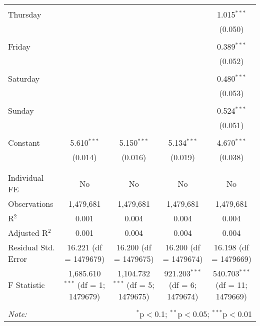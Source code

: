\documentclass[
]{article}
\begin{document}
\begin{table}[!htbp]
{\begin{tabular}{@{\extracolsep{5pt}}lcccc}
  & & & & \\ 
 Thursday &  &  &  & 1.015$^{***}$ \\ 
  &  &  &  & (0.050) \\ 
  & & & & \\ 
 Friday &  &  &  & 0.389$^{***}$ \\ 
  &  &  &  & (0.052) \\ 
  & & & & \\ 
 Saturday &  &  &  & 0.480$^{***}$ \\ 
  &  &  &  & (0.053) \\ 
  & & & & \\ 
 Sunday &  &  &  & 0.524$^{***}$ \\ 
  &  &  &  & (0.051) \\ 
  & & & & \\ 
 Constant & 5.610$^{***}$ & 5.150$^{***}$ & 5.134$^{***}$ & 4.670$^{***}$ \\ 
  & (0.014) & (0.016) & (0.019) & (0.038) \\ 
  & & & & \\ 
\hline \\[-1.8ex] 
Individual FE & No & No & No & No \\ 
Observations & 1,479,681 & 1,479,681 & 1,479,681 & 1,479,681 \\ 
R$^{2}$ & 0.001 & 0.004 & 0.004 & 0.004 \\ 
Adjusted R$^{2}$ & 0.001 & 0.004 & 0.004 & 0.004 \\ 
Residual Std. Error & 16.221 (df = 1479679) & 16.200 (df = 1479675) & 16.200 (df = 1479674) & 16.198 (df = 1479669) \\ 
F Statistic & 1,685.610$^{***}$ (df = 1; 1479679) & 1,104.732$^{***}$ (df = 5; 1479675) & 921.203$^{***}$ (df = 6; 1479674) & 540.703$^{***}$ (df = 11; 1479669) \\ 
\hline 
\hline \\[-1.8ex] 
\textit{Note:}  & \multicolumn{4}{r}{$^{*}$p$<$0.1; $^{**}$p$<$0.05; $^{***}$p$<$0.01} \\ 
\end{tabular}
} 
\end{table} 
\newpage
\end{document}
